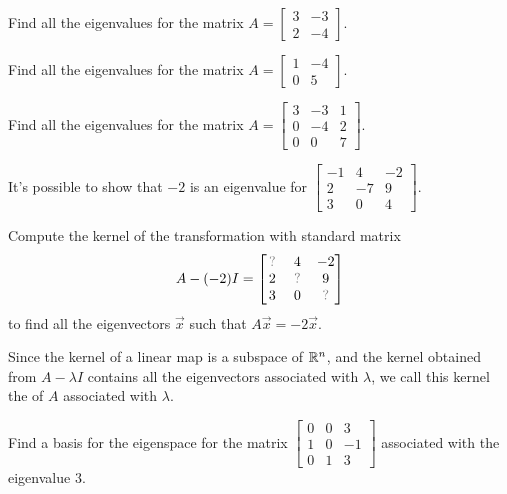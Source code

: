 \begin{activity}{5}
  Find all the eigenvalues for the matrix
  \(A=\begin{bmatrix} 3 & -3 \\ 2 & -4 \end{bmatrix}\).
\end{activity}

\begin{activity}{5}
  Find all the eigenvalues for the matrix
  \(A=\begin{bmatrix} 1 & -4 \\ 0 & 5 \end{bmatrix}\).
\end{activity}

\begin{activity}{10}
  Find all the eigenvalues for the matrix
  \(A=\begin{bmatrix} 3 & -3 & 1 \\ 0 & -4 & 2 \\ 0 & 0 & 7 \end{bmatrix}\).
\end{activity}




\begin{activity}{10}
It's possible to show that \(-2\) is an eigenvalue for
\(\begin{bmatrix}-1&4&-2\\2&-7&9\\3&0&4\end{bmatrix}\).

\vspace{1em}

Compute the kernel of the transformation with standard matrix
\[
  A-(-2)I
    =
  \begin{bmatrix} \unknown & 4&-2 \\ 2 & \unknown & 9\\3&0&\unknown \end{bmatrix}
\] 
to find all the eigenvectors \(\vec x\) such that \(A\vec x=-2\vec x\).
\end{activity}

\begin{definition}
  Since the kernel of a linear map is a subspace
  of \(\mathbb{R}^n\), and the kernel obtained from \(A-\lambda I\)
  contains all the eigenvectors associated with \(\lambda\),
  we call this kernel the  of \(A\) associated with \(\lambda\).
\end{definition}

\begin{activity}{10}
Find a basis for the eigenspace for the matrix
\(
  \begin{bmatrix}
    0 & 0 & 3 \\ 1 & 0 & -1 \\ 0 & 1 & 3
  \end{bmatrix}
\)
associated with the eigenvalue \(3\).
\end{activity}


